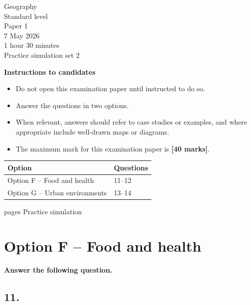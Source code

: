 \documentclass[11pt,a4paper]{article}
\begin{document}
\thispagestyle{empty}
\begin{center}
{\Large Geography}\\[0.35em]
Standard level\\[0.35em]
Paper 1\\[1.8em]
7 May 2026\\[1.8em]
1 hour 30 minutes\\[2.8em]
Practice simulation set 2
\end{center}

\vspace{1.4em}

\textbf{Instructions to candidates}
\begin{itemize}
  \item Do not open this examination paper until instructed to do so.
  \item Answer the questions in two options.
  \item When relevant, answers should refer to case studies or examples, and
  where appropriate include well-drawn maps or diagrams.
  \item The maximum mark for this examination paper is \textbf{[40 marks]}.
\end{itemize}

\vspace{1.2em}

\begin{center}
\begin{tabular}{L{0.48\textwidth}L{0.22\textwidth}}
\toprule
\textbf{Option} & \textbf{Questions} \\
\midrule
Option F -- Food and health & 11--12 \\
Option G -- Urban environments & 13--14 \\
\bottomrule
\end{tabular}
\end{center}

\vfill
{} pages \hfill Practice simulation

\newpage

\section{Option F -- Food and health}

\textbf{Answer the following question.}

\subsection{11.}
\end{document}
